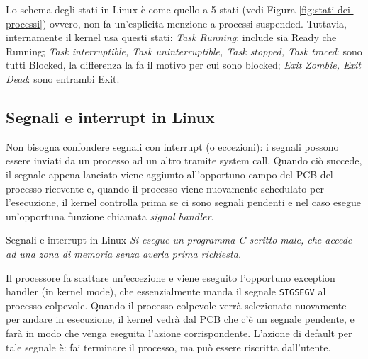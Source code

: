 Lo schema degli stati in Linux è come quello a 5 stati (vedi Figura \ref{fig:stati-dei-processi}) ovvero, non fa un'esplicita menzione a processi suspended. Tuttavia, internamente il kernel usa questi stati: \textit{Task Running}: include sia Ready che Running; \textit{Task interruptible, Task uninterruptible, Task stopped, Task traced}: sono tutti Blocked, la differenza la fa il motivo per cui sono blocked; \textit{Exit Zombie, Exit Dead}: sono entrambi Exit.

\subsection*{Segnali e interrupt in Linux}
Non bisogna confondere segnali con interrupt (o eccezioni): i segnali possono essere inviati da un processo ad un altro tramite system call. Quando ciò succede, il segnale appena lanciato viene aggiunto all'opportuno campo del PCB del processo ricevente e, quando il processo viene nuovamente schedulato per l'esecuzione, il kernel controlla prima se ci sono segnali pendenti e nel caso esegue un'opportuna funzione chiamata \textit{signal handler}.

\begin{Example}{Segnali e interrupt in Linux}{}
    \textit{Si esegue un programma C scritto male, che accede ad una zona di memoria senza averla prima richiesta.}

    Il processore fa scattare un'eccezione e viene eseguito l'opportuno exception handler (in kernel mode), che essenzialmente manda il segnale \verb|SIGSEGV| al processo colpevole. Quando il processo colpevole verrà selezionato nuovamente per andare in esecuzione, il kernel vedrà dal PCB che c'è un segnale pendente, e farà in modo che venga eseguita l'azione corrispondente. L'azione di default per tale segnale è: fai terminare il processo, ma può essere riscritta dall'utente.
\end{Example}